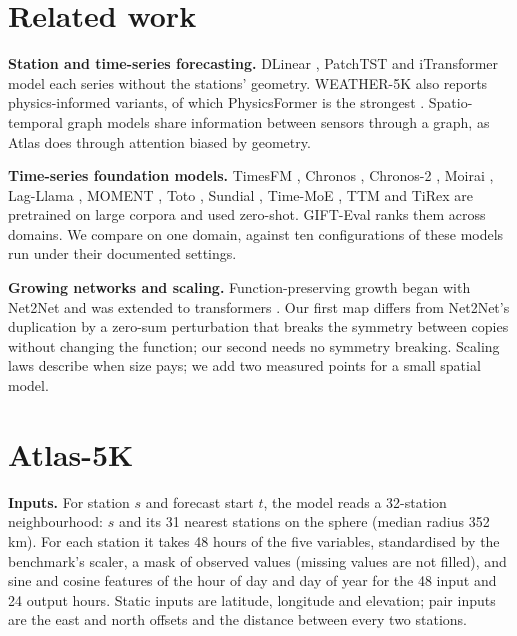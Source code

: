 \documentclass{article}
\begin{document}
\section{Related work}

\textbf{Station and time-series forecasting.} DLinear \citep{zeng2023dlinear}, PatchTST \citep{nie2023patchtst} and
iTransformer \citep{liu2024itransformer} model each series without the stations' geometry. WEATHER-5K also reports
physics-informed variants, of which PhysicsFormer is the strongest \citep{han2026weather5k}. Spatio-temporal graph
models \citep{li2018dcrnn,wu2019graphwavenet,shao2022stid} share information between sensors through a graph, as Atlas
does through attention biased by geometry.

\textbf{Time-series foundation models.} TimesFM \citep{das2024timesfm}, Chronos \citep{ansari2024chronos}, Chronos-2
\citep{ansari2025chronos2}, Moirai \citep{woo2024moirai}, Lag-Llama \citep{rasul2023lagllama}, MOMENT
\citep{goswami2024moment}, Toto \citep{cohen2024toto}, Sundial \citep{liu2025sundial}, Time-MoE \citep{shi2025timemoe},
TTM \citep{ekambaram2024ttm} and TiRex \citep{auer2025tirex} are pretrained on large corpora and used zero-shot.
GIFT-Eval \citep{aksu2024gifteval} ranks them across domains. We compare on one domain, against ten configurations of
these models run under their documented settings.

\textbf{Growing networks and scaling.} Function-preserving growth began with Net2Net \citep{chen2016net2net} and was
extended to transformers \citep{gong2019stacking,chen2022bert2bert,wang2023ligo}. Our first map differs from Net2Net's
duplication by a zero-sum perturbation that breaks the symmetry between copies without changing the function; our
second needs no symmetry breaking. Scaling laws \citep{kaplan2020scaling,hoffmann2022chinchilla} describe when size
pays; we add two measured points for a small spatial model.

\section{Atlas-5K}
\label{sec:model}

\textbf{Inputs.} For station $s$ and forecast start $t$, the model reads a 32-station neighbourhood: $s$ and its 31
nearest stations on the sphere (median radius 352\,km). For each station it takes 48 hours of the five variables,
standardised by the benchmark's scaler, a mask of observed values (missing values are not filled), and sine and cosine
features of the hour of day and day of year for the 48 input and 24 output hours. Static inputs are latitude,
longitude and elevation; pair inputs are the east and north offsets and the distance between every two stations.
\end{document}
